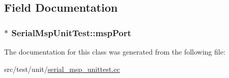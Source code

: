 \subsection{Field Documentation}
\hypertarget{classSerialMspUnitTest_a4c1150a8bbef5915721ee48b6a765cbf}{
\subsubsection[{msp\+Port}]{$\ast$ Serial\+Msp\+Unit\+Test\+::msp\+Port\hspace{0.3cm}{\ttfamily [protected]}}}\label{classSerialMspUnitTest_a4c1150a8bbef5915721ee48b6a765cbf}


The documentation for this class was generated from the following file\+:\begin{DoxyCompactItemize}
\item 
src/test/unit/\hyperlink{serial__msp__unittest_8cc}{serial\+\_\+msp\+\_\+unittest.\+cc}\end{DoxyCompactItemize}
